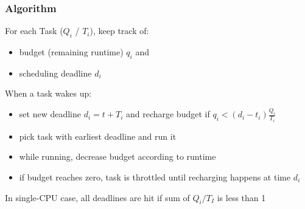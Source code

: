 \documentclass[aspectratio=1610,xcolor=svgnames]{beamer}
\begin{document}
\begin{frame}
\end{frame}

\begin{frame}\frametitle{Algorithm}
  For each Task ($Q_i$ / $T_i$), keep track of:
  \begin{itemize}
  \item budget (remaining runtime) $q_i$ and
  \item scheduling deadline $d_i$
  \end{itemize}
  When a task wakes up:
  \begin{itemize}
    \item set new deadline $d_i = t + T_i$ and recharge budget if $q_i < (d_i - t_i) \frac{Q_i}{T_i}$
    \item pick task with earliest deadline and run it
    \item while running, decrease budget according to runtime
    \item if budget reaches zero, task is throttled until recharging happens at time $d_i$
  \end{itemize}
  In single-CPU case, all deadlines are hit if sum of $Q_i / T_I$
  is less than 1
\end{frame}
\end{document}
